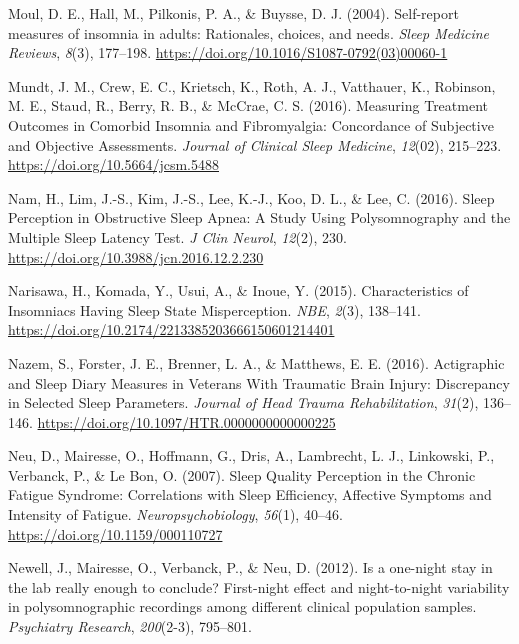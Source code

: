 \documentclass[
]{article}
\newlength{\cslhangindent}
\newenvironment{CSLReferences}[2] %
 {\begin{list}{}{%
  \setlength{\itemindent}{0pt}
  \setlength{\leftmargin}{0pt}
  \setlength{\parsep}{0pt}
  \ifodd #1
   \setlength{\leftmargin}{\cslhangindent}
   \setlength{\itemindent}{-1\cslhangindent}
  \fi
  \setlength{\itemsep}{#2\baselineskip}}}
 {\end{list}}
\begin{document}
\begin{CSLReferences}{1}{0}
Moul, D. E., Hall, M., Pilkonis, P. A., \& Buysse, D. J. (2004). {Self-report measures of insomnia in adults: Rationales, choices, and needs}. \emph{Sleep Medicine Reviews}, \emph{8}(3), 177--198. \url{https://doi.org/10.1016/S1087-0792(03)00060-1}

Mundt, J. M., Crew, E. C., Krietsch, K., Roth, A. J., Vatthauer, K., Robinson, M. E., Staud, R., Berry, R. B., \& McCrae, C. S. (2016). Measuring {Treatment} {Outcomes} in {Comorbid} {Insomnia} and {Fibromyalgia}: {Concordance} of {Subjective} and {Objective} {Assessments}. \emph{Journal of Clinical Sleep Medicine}, \emph{12}(02), 215--223. \url{https://doi.org/10.5664/jcsm.5488}

Nam, H., Lim, J.-S., Kim, J.-S., Lee, K.-J., Koo, D. L., \& Lee, C. (2016). Sleep {Perception} in {Obstructive} {Sleep} {Apnea}: {A} {Study} {Using} {Polysomnography} and the {Multiple} {Sleep} {Latency} {Test}. \emph{J Clin Neurol}, \emph{12}(2), 230. \url{https://doi.org/10.3988/jcn.2016.12.2.230}

Narisawa, H., Komada, Y., Usui, A., \& Inoue, Y. (2015). Characteristics of {Insomniacs} {Having} {Sleep} {State} {Misperception}. \emph{NBE}, \emph{2}(3), 138--141. \url{https://doi.org/10.2174/2213385203666150601214401}

Nazem, S., Forster, J. E., Brenner, L. A., \& Matthews, E. E. (2016). Actigraphic and {Sleep} {Diary} {Measures} in {Veterans} {With} {Traumatic} {Brain} {Injury}: {Discrepancy} in {Selected} {Sleep} {Parameters}. \emph{Journal of Head Trauma Rehabilitation}, \emph{31}(2), 136--146. \url{https://doi.org/10.1097/HTR.0000000000000225}

Neu, D., Mairesse, O., Hoffmann, G., Dris, A., Lambrecht, L. J., Linkowski, P., Verbanck, P., \& Le Bon, O. (2007). Sleep {Quality} {Perception} in the {Chronic} {Fatigue} {Syndrome}: {Correlations} with {Sleep} {Efficiency}, {Affective} {Symptoms} and {Intensity} of {Fatigue}. \emph{Neuropsychobiology}, \emph{56}(1), 40--46. \url{https://doi.org/10.1159/000110727}

Newell, J., Mairesse, O., Verbanck, P., \& Neu, D. (2012). Is a one-night stay in the lab really enough to conclude? First-night effect and night-to-night variability in polysomnographic recordings among different clinical population samples. \emph{Psychiatry Research}, \emph{200}(2-3), 795--801.


\end{CSLReferences}
\end{document}
